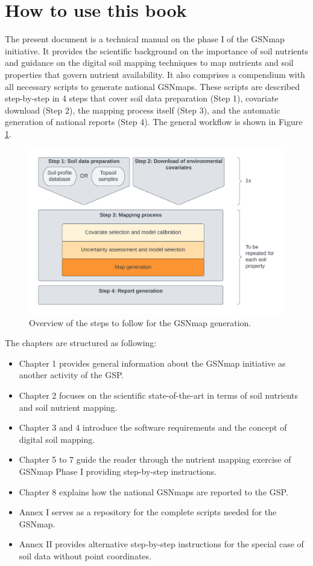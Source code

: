 \documentclass[
  10pt,
  b5paper,
  oneside]{book}
\providecommand{\tightlist}{%
  \setlength{\itemsep}{0pt}\setlength{\parskip}{0pt}}
\begin{document}
\hypertarget{how-to-use-this-book}{%
\section{How to use this book}\label{how-to-use-this-book}}

The present document is a technical manual on the phase I of the GSNmap initiative. It provides the scientific background on the importance of soil nutrients and guidance on the digital soil mapping techniques to map nutrients and soil properties that govern nutrient availability. It also comprises a compendium with all necessary scripts to generate national GSNmaps. These scripts are described step-by-step in 4 steps that cover soil data preparation (Step 1), covariate download (Step 2), the mapping process itself (Step 3), and the automatic generation of national reports (Step 4). The general workflow is shown in Figure \ref{fig:steps}.

\begin{figure}
\includegraphics[width=28.12in]{images/Manual-Workflow} \caption{Overview of the steps to follow for the GSNmap generation.}\label{fig:steps}
\end{figure}

The chapters are structured as following:

\begin{itemize}
\tightlist
\item
  Chapter 1 provides general information about the GSNmap initiative as another activity of the GSP.
\item
  Chapter 2 focuses on the scientific state-of-the-art in terms of soil nutrients and soil nutrient mapping.
\item
  Chapter 3 and 4 introduce the software requirements and the concept of digital soil mapping.
\item
  Chapter 5 to 7 guide the reader through the nutrient mapping exercise of GSNmap Phase I providing step-by-step instructions.
\item
  Chapter 8 explains how the national GSNmaps are reported to the GSP.
\item
  Annex I serves as a repository for the complete scripts needed for the GSNmap.
\item
  Annex II provides alternative step-by-step instructions for the special case of soil data without point coordinates.
\end{itemize}
\end{document}
